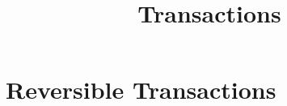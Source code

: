 \documentclass[../../OAE-SPEC-MAIN.tex]{subfiles}
\title{Transactions}
\begin{document}
\chapter{Reversible Transactions}\label{sec:reversible-transactions}



\clearpage

\clearpage

\clearpage

\clearpage

\end{document}
